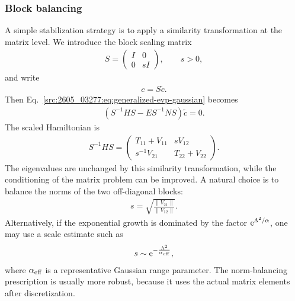 \subsubsection{Block balancing}
A simple stabilization strategy is to apply a similarity transformation at the
matrix level.
We introduce the block scaling matrix
\begin{align}
    S
    =
    \begin{pmatrix}
        I & 0 \\
        0 & s I
    \end{pmatrix},
    \qquad
    s>0 ,
\end{align}
and write
\begin{align}
    c = S \tilde{c}.
\end{align}
Then Eq.~\eqref{src:2605_03277:eq:generalized-evp-gaussian} becomes
\begin{align}
    \left(
        S^{-1} H S
        -
        E S^{-1} N S
    \right)
    \tilde{c}
    =
    0 .
\end{align}
The scaled Hamiltonian is
\begin{align}
    S^{-1} H S
    =
    \begin{pmatrix}
        T_{11}+V_{11} & s V_{12} \\
        s^{-1}V_{21} & T_{22}+V_{22}
    \end{pmatrix}.
\end{align}
The eigenvalues are unchanged by this similarity transformation, while the
conditioning of the matrix problem can be improved.
A natural choice is to balance the norms of the two off-diagonal blocks:
\begin{align}
    s
    =
    \sqrt{
        \frac{
            \lVert V_{21}\rVert
        }{
            \lVert V_{12}\rVert
        }
    } .
\end{align}
Alternatively, if the exponential growth is dominated by the factor
$\mathrm{e}^{\Lambda^2/\alpha}$, one may use a scale estimate such as
\begin{align}
    s
    \sim
    \mathrm{e}^{
        -\frac{\Lambda^2}{\alpha_{\mathrm{eff}}}
    },
\end{align}
where $\alpha_{\mathrm{eff}}$ is a representative Gaussian range parameter.
The norm-balancing prescription is usually more robust, because it uses the
actual matrix elements after discretization.
